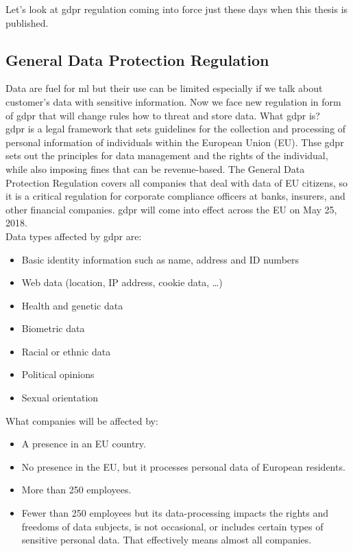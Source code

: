 \documentclass[thesis=M,english]{FITthesis}[2012/06/26]
\begin{document}
Let's look at \acrshort{gdpr} regulation coming into force just these days when this thesis is published.

\subsection{General Data Protection Regulation}

Data are fuel for \acrshort{ml} but their use can be limited especially if we talk about customer's data with sensitive information. Now we face new regulation in form of \acrshort{gdpr} that will change rules how to threat and store data. What \acrshort{gdpr} is?\\

\acrshort{gdpr}\cite{gdpr_info} is a legal framework that sets guidelines for the collection and processing of personal information of individuals within the European Union (EU). Thse \acrshort{gdpr} sets out the principles for data management and the rights of the individual, while also imposing fines that can be revenue-based. The General Data Protection Regulation covers all companies that deal with data of EU citizens, so it is a critical regulation for corporate compliance officers at banks, insurers, and other financial companies. \acrshort{gdpr} will come into effect across the EU on May 25, 2018.\\

Data types affected by \acrshort{gdpr} are:
\begin{itemize}[nosep]
\item Basic identity information such as name, address and ID numbers
\item Web data (location, IP address, cookie data, \dots)
\item Health and genetic data
\item Biometric data
\item Racial or ethnic data
\item Political opinions
\item Sexual orientation\\
\end{itemize}

What companies will be affected by:
\begin{itemize}[nosep]
	\item A presence in an EU country.
	\item No presence in the EU, but it processes personal data of European residents.
	\item More than 250 employees.
	\item Fewer than 250 employees but its data-processing impacts the rights and freedoms of data subjects, is not occasional, or includes certain types of sensitive personal data. That effectively means almost all companies.\\
\end{itemize}
\end{document}
